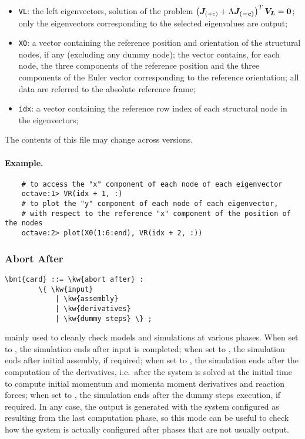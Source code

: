 \begin{itemize}
\item \texttt{VL}: the left eigenvectors, solution of the problem
$\left( \boldsymbol{J}_{(+c)} + \Lambda \boldsymbol{J_{(-c)}} \right)^T\boldsymbol{V_L}=\boldsymbol{0}$;
only the eigenvectors corresponding to the selected eigenvalues are output;

\item \texttt{X0}: a vector containing the reference position
and orientation of the structural nodes, if any (excluding any dummy node);
the vector contains, for each node, the three components
of the reference position and the three components of the Euler vector
corresponding to the reference orientation; all data are referred
to the absolute reference frame;

\item \texttt{idx}: a vector containing the reference row index
of each structural node in the eigenvectors;
\end{itemize}
The contents of this file may change across versions.

\paragraph{Example.}
\begin{verbatim}
    # to access the "x" component of each node of each eigenvector
    octave:1> VR(idx + 1, :)
    # to plot the "y" component of each node of each eigenvector,
    # with respect to the reference "x" component of the position of the nodes
    octave:2> plot(X0(1:6:end), VR(idx + 2, :))
\end{verbatim}



\subsubsection{Abort After}
\label{sec:IVP:abort after}
\begin{Verbatim}[commandchars=\\\{\}]
    \bnt{card} ::= \kw{abort after} :
        \{ \kw{input} 
            | \kw{assembly}
            | \kw{derivatives}
            | \kw{dummy steps} \} ;
\end{Verbatim}
mainly used to cleanly check models and simulations at various phases.
When set to , the simulation ends after input is completed;
when set to , the simulation ends after initial assembly,
if required;
when set to , the simulation ends after the computation
of the derivatives, i.e.\ after the system is solved at the initial
time to compute initial momentum and momenta moment derivatives and 
reaction forces;
when set to , the simulation ends after the dummy steps
execution, if required.
In any case, the output is generated with the system configured 
as resulting from the last computation phase, so this mode can be useful 
to check how the system is actually configured after phases that are not 
usually output.


